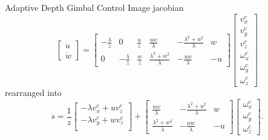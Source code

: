 \documentclass[9pt]{beamer}
\begin{document}
\begin{frame}{Adaptive Depth Gimbal Control}
Image jacobian
$$\begin{bmatrix}
	\dot{u} \\ \dot{w}
\end{bmatrix}
=\begin{bmatrix}
	-\frac{\lambda}{z} & 0 & \frac{u}{z} & \frac{uw}{\lambda} & -\frac{\lambda^2+u^2}{\lambda} & w \\
	0 & -\frac{\lambda}{z} & \frac{w}{z} & \frac{\lambda^2+w^2}{\lambda} & -\frac{uw}{\lambda} & -u
\end{bmatrix}
\begin{bmatrix}
	v_x^c \\ v_y^c \\ v_z^c \\
	\omega_x^c \\ \omega_y^c \\ \omega_z^c
\end{bmatrix}$$
rearranged into 
$$\dot{s}
=\frac{1}{z}
\begin{bmatrix}
-\lambda v_x^c+uv_z^c \\
-\lambda v_y^c+wv_z^c \\
\end{bmatrix}
+\begin{bmatrix}
\frac{uw}{\lambda} & -\frac{\lambda^2+u^2}{\lambda} & w \\
\frac{\lambda^2+w^2}{\lambda} & -\frac{uw}{\lambda} & -u
\end{bmatrix}
\begin{bmatrix}
\omega_x^c \\ \omega_y^c \\ \omega_z^c
\end{bmatrix}.$$
\end{frame}
\end{document}
